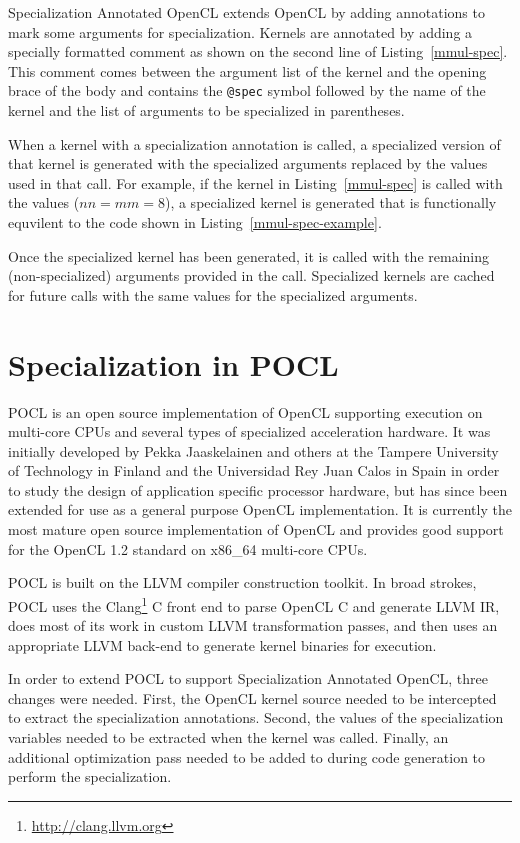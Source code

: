 \documentclass{acm_proc_article-sp}
\begin{document}
Specialization Annotated OpenCL extends OpenCL by adding annotations to mark
some arguments for specialization. Kernels are annotated by adding a specially
formatted comment as shown on the second line of Listing~\ref{mmul-spec}. This
comment comes between the argument list of the kernel and the opening brace of
the body and contains the {\tt @spec} symbol followed by the name of the kernel
and the list of arguments to be specialized in parentheses.

When a kernel with a specialization annotation is called, a specialized version
of that kernel is generated with the specialized arguments replaced by the values
used in that call. For example, if the kernel in Listing~\ref{mmul-spec} is called
with the values ($nn = mm = 8$), a specialized kernel is generated that is
functionally equvilent to the code shown in Listing~\ref{mmul-spec-example}.

Once the specialized kernel has been generated, it is called with the remaining
(non-specialized) arguments provided in the call. Specialized kernels are
cached for future calls with the same values for the specialized arguments.

\section{Specialization in POCL}
\label{pocl-spec}

POCL is an open source implementation of OpenCL supporting execution on
multi-core CPUs and several types of specialized acceleration hardware. It was
initially developed\cite{Jaaskelainen:2010:POCL} by Pekka Jaaskelainen and
others at the Tampere University of Technology in Finland and the Universidad
Rey Juan Calos in Spain in order to study the design of application specific
processor hardware, but has since been extended for use as a general purpose
OpenCL implementation. It is currently the most mature open source
implementation of OpenCL and provides good support for the OpenCL 1.2 standard
on x86\_64 multi-core CPUs.

POCL is built on the LLVM\cite{Lattner:2002:LLVM} compiler construction
toolkit. In broad strokes, POCL uses the
Clang\footnote{\url{http://clang.llvm.org}} C front end to parse OpenCL C and
generate LLVM IR, does most of its work in custom LLVM transformation passes,
and then uses an appropriate LLVM back-end to generate kernel binaries for
execution.

In order to extend POCL to support Specialization Annotated OpenCL, three
changes were needed. First, the OpenCL kernel source needed to be intercepted
to extract the specialization annotations. Second, the values of the
specialization variables needed to be extracted when the kernel was called.
Finally, an additional optimization pass needed to be added to during code
generation to perform the specialization.
\end{document}
